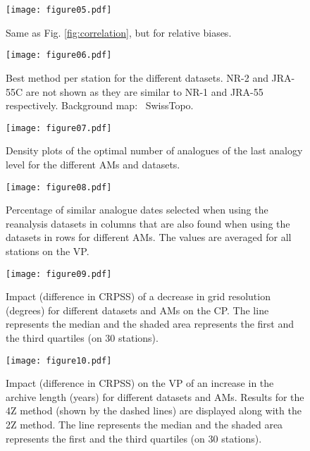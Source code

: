 \documentclass{ametsoc}
\begin{document}
	\begin{figure*}[t]
		\noindent\texttt{[image: figure05.pdf]}\\
		\caption{Same as Fig. \ref{fig:correlation}, but for relative biases.}
		\label{fig:biases}
	\end{figure*}
	
	\begin{figure*}[t]
		\noindent\texttt{[image: figure06.pdf]}\\
		\caption{Best method per station for the different datasets. NR-2 and JRA-55C are not shown as they are similar to NR-1 and JRA-55 respectively. Background map: \textcopyright\ SwissTopo.}
		\label{fig:map_best_methods}
	\end{figure*}
	
	\begin{figure}[t]
		\noindent\texttt{[image: figure07.pdf]}\\
		\caption{Density plots of the optimal number of analogues of the last analogy level for the different AMs and datasets.}
		\label{fig:number_analogues}
	\end{figure}
	
	\begin{figure}[t]
		\noindent\texttt{[image: figure08.pdf]}\\
		\caption{Percentage of similar analogue dates selected when using the reanalysis datasets in columns that are also found when using the datasets in rows for different AMs. The values are averaged for all stations on the VP.}
		\label{fig:similarities_analogue_dates}
	\end{figure}
	
	\begin{figure}[t]
		\noindent\texttt{[image: figure09.pdf]}\\
		\caption{Impact (difference in CRPSS) of a decrease in grid resolution (degrees) for different datasets and AMs on the CP. The line represents the median and the shaded area represents the first and the third quartiles (on 30 stations).}
		\label{fig:plot_impact_resolution}
	\end{figure}
	
	\begin{figure}[t]
		\noindent\texttt{[image: figure10.pdf]}\\
		\caption{Impact (difference in CRPSS) on the VP of an increase in the archive length (years) for different datasets and AMs. Results for the 4Z method (shown by the dashed lines) are displayed along with the 2Z method. The line represents the median and the shaded area represents the first and the third quartiles (on 30 stations).}
		\label{fig:plot_impact_length}
	\end{figure}
	
\end{document}
